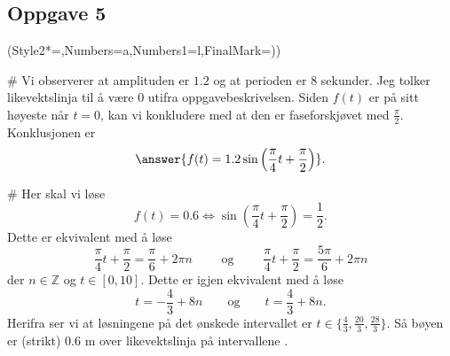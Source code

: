 \subsection*{Oppgave 5}
\begin{easylist}[enumerate]
	\ListProperties(Style2*=,Numbers=a,Numbers1=l,FinalMark={)})

	# Vi observerer at amplituden er $1.2$ og at perioden er $8$ sekunder.
	Jeg tolker likevektslinja til å være $0$ utifra oppgavebeskrivelsen.
	Siden $f(t)$ er på sitt høyeste når $t=0$, kan vi konkludere med at den er faseforskjøvet med $\frac{\pi}{2}$.
	Konklusjonen er
	\begin{equation*}
	\answer{f(t)=1.2\sin\left(\frac{\pi}{4}t + \frac{\pi}{2} \right)}.
	\end{equation*}


	# Her skal vi løse
	\begin{equation*}
	f(t)=0.6 \Longleftrightarrow \sin\left(\frac\pi4 t + \frac\pi2 \right)=\frac12 .
	\end{equation*}
	Dette er ekvivalent med å løse
	\begin{equation*}
	\frac\pi4 t + \frac\pi2 = \frac\pi6 + 2\pi n \qquad \text{ og } \qquad \frac\pi4 t + \frac\pi2 = \frac{5\pi}{6} + 2\pi n
	\end{equation*}
	der $n \in \mathbb{Z}$ og $t \in [0,10]$.
	Dette er igjen ekvivalent med å løse
	\begin{equation*}
	t=-\frac{4}{3} + 8n \qquad \text{og} \qquad t=\frac43 + 8n.
	\end{equation*}
	Herifra ser vi at løsningene på det ønskede intervallet er $t\in\{\frac43, \frac{20}{3},\frac{28}{3}\}$.
	Så bøyen er (strikt) 0.6 m over likevektslinja på intervallene .
\end{easylist}


